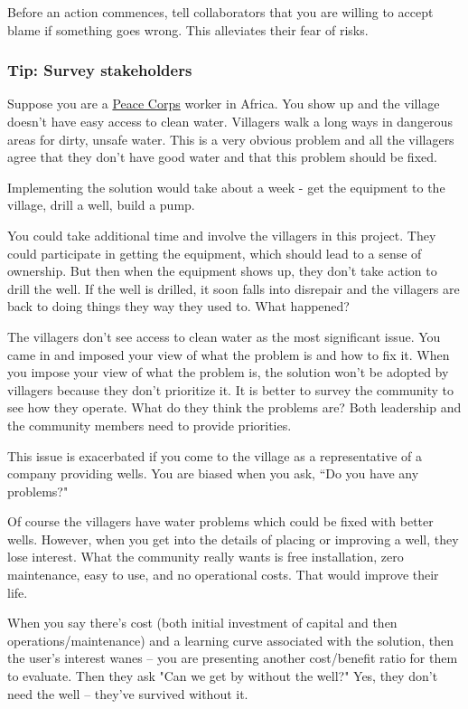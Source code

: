 Before an action commences, tell collaborators that you are willing to accept blame if something goes wrong. This alleviates their fear of risks.

\subsubsection{Tip: Survey stakeholders}

Suppose you are a \href{http://www.peacecorps.gov/}{Peace Corps} worker in Africa. You show up and the village doesn't have easy access to clean water. Villagers walk a long ways in dangerous areas for dirty, unsafe water. This is a very obvious problem and all the villagers agree that they don't have good water and that this problem should be fixed.

Implementing the solution would take about a week - get the equipment to the village, drill a well, build a pump.

You could take additional time and involve the villagers in this project. They could participate in getting the equipment, which should lead to a sense of ownership.
But then when the equipment shows up, they don't take action to drill the well. If the well is drilled, it soon falls into disrepair and the villagers are back to doing things they way they used to. What happened?

The villagers don't see access to clean water as the most significant issue. You came in and imposed your view of what the problem is and how to fix it. When you impose your view of what the problem is, the solution won't be adopted by villagers because they don't prioritize it.
It is better to survey the community to see how they operate. What do they think the problems are?
Both leadership and the community members need to provide priorities.

This issue is exacerbated if you come to the village as a representative of a company providing wells. You are biased when you ask, ``Do you have any problems?"

Of course the villagers have water problems which could be fixed with better wells. However, when you get into the details of placing or improving a well, they lose interest. What the community really wants is free installation, zero maintenance, easy to use, and no operational costs. That would improve their life.

When you say there's cost (both initial investment of capital and then operations/maintenance) and a learning curve associated with the solution, then the user's interest wanes -- you are presenting another cost/benefit ratio for them to evaluate. Then they ask "Can we get by without the well?" Yes, they don't need the well -- they've survived without it.

